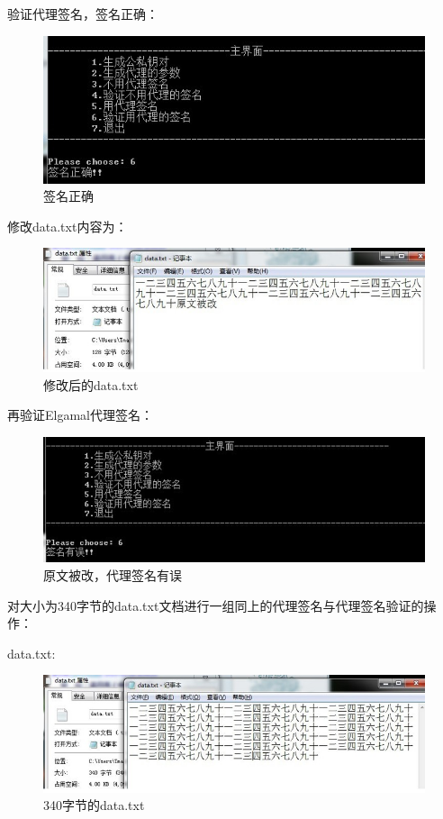 验证代理签名，签名正确：

\begin{figure}[H]
\centering
\includegraphics{img/26.jpg}
\caption{签名正确}
\end{figure}

修改data.txt内容为：

\begin{figure}[H]
\centering
\includegraphics{img/28.jpg}
\caption{修改后的data.txt}
\end{figure}

再验证Elgamal代理签名：

\begin{figure}[H]
\centering
\includegraphics{img/29.jpg}
\caption{原文被改，代理签名有误}
\end{figure}

对大小为340字节的data.txt文档进行一组同上的代理签名与代理签名验证的操作：

data.txt:

\begin{figure}[H]
\centering
\includegraphics{img/30.jpg}
\caption{340字节的data.txt}
\end{figure}

